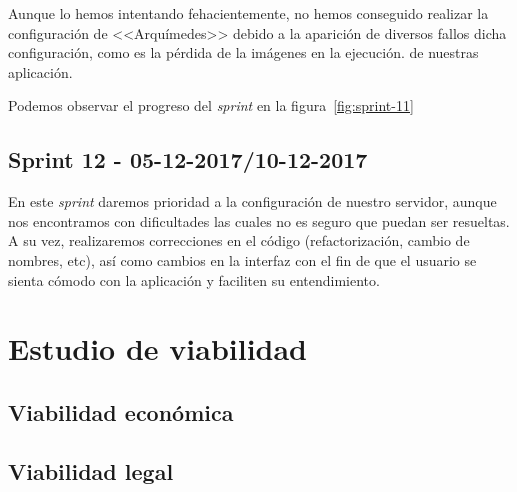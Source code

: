 Aunque lo hemos intentando fehacientemente, no hemos conseguido realizar la configuración de <<Arquímedes>> debido a la aparición de diversos fallos dicha configuración, como es la pérdida de la imágenes en la ejecución. de nuestras aplicación.

Podemos observar el progreso del \textit{sprint} en la figura~\ref{fig:sprint-11}

\subsection{Sprint 12 - 05-12-2017/10-12-2017}
En este \textit{sprint} daremos prioridad a la configuración de nuestro servidor, aunque nos encontramos con dificultades las cuales no es seguro que puedan ser resueltas. A su vez, realizaremos correcciones en el código (refactorización, cambio de nombres, etc), así como cambios en la interfaz con el fin de que el usuario se sienta cómodo con la aplicación y faciliten su entendimiento.
\section{Estudio de viabilidad}

\subsection{Viabilidad económica}

\subsection{Viabilidad legal}


